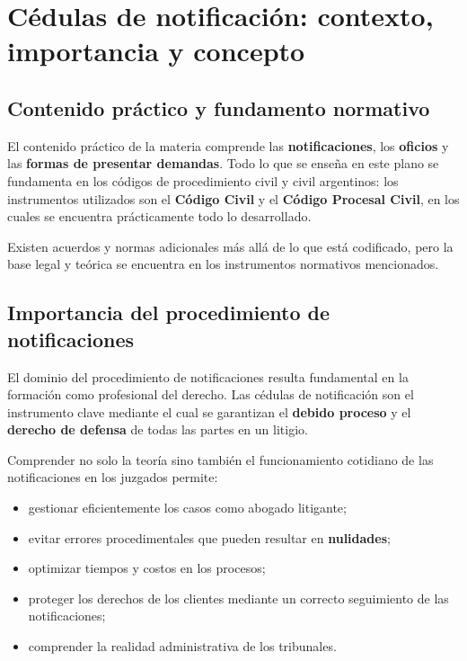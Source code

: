 \documentclass[12pt,oneside]{book}
\begin{document}
\chapter[Cédulas de notificación]{Cédulas de notificación: contexto, importancia y concepto}

\section{Contenido práctico y fundamento normativo}

El contenido práctico de la materia comprende las \textbf{notificaciones}, los \textbf{oficios} y las \textbf{formas de presentar demandas}. Todo lo que se enseña en este plano se fundamenta en los códigos de procedimiento civil y civil argentinos: los instrumentos utilizados son el \textbf{Código Civil} y el \textbf{Código Procesal Civil}, en los cuales se encuentra prácticamente todo lo desarrollado.

\begin{note}
Existen acuerdos y normas adicionales más allá de lo que está codificado, pero la base legal y teórica se encuentra en los instrumentos normativos mencionados.
\end{note}

\section{Importancia del procedimiento de notificaciones}

El dominio del procedimiento de notificaciones resulta fundamental en la formación como profesional del derecho. Las cédulas de notificación son el instrumento clave mediante el cual se garantizan el \textbf{debido proceso} y el \textbf{derecho de defensa} de todas las partes en un litigio.

Comprender no solo la teoría sino también el funcionamiento cotidiano de las notificaciones en los juzgados permite:

\begin{itemize}
    \item gestionar eficientemente los casos como abogado litigante;
    \item evitar errores procedimentales que pueden resultar en \textbf{nulidades};
    \item optimizar tiempos y costos en los procesos;
    \item proteger los derechos de los clientes mediante un correcto seguimiento de las notificaciones;
    \item comprender la realidad administrativa de los tribunales.
\end{itemize}
\end{document}

